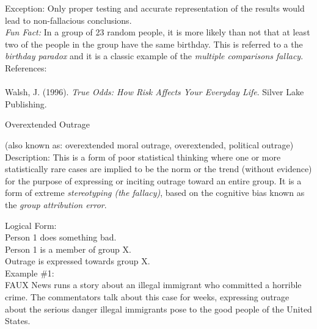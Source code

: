 \documentclass[a4paper,12pt,single,pdftex]{scrartcl}
\begin{document}
    
      Exception: Only proper testing and accurate representation of the results would lead to non-fallacious conclusions.
    \\

    
      {\em Fun Fact:} In a group of 23 random people, it is more likely than not that at least two of the people in the group have the same birthday. This is referred to a the {\em birthday paradox} and it is a classic example of the {\em multiple comparisons fallacy}.
    \\

    
      References:
    \\

    
      
        
      \\

      
        
          Walsh, J. (1996). {\it True Odds: How Risk Affects Your Everyday Life}. Silver Lake Publishing.
        
      
    
  

Overextended Outrage
    
      (also known as: overextended moral outrage, overextended, political outrage)
    \\

  
    Description: This is a form of poor statistical thinking where one or more statistically rare cases are implied to be the norm or the trend (without evidence) for the purpose of expressing or inciting outrage toward an entire group. It is a form of extreme {\it stereotyping (the fallacy)}, based on the cognitive bias known as the {\it group attribution error}.

    
      Logical Form:
    \\

    
      Person 1 does something bad.
    \\

    
      Person 1 is a member of group X.
    \\

    
      Outrage is expressed towards group X.
    \\

    
      Example \#1:
    \\

    
      FAUX News runs a story about an illegal immigrant who committed a horrible crime. The commentators talk about this case for weeks, expressing outrage about the serious danger illegal immigrants pose to the good people of the United States.
    \\
\end{document}
